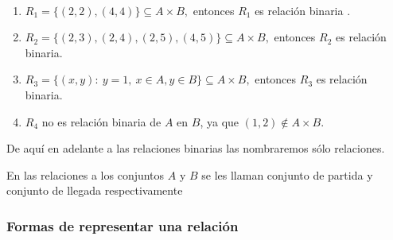 \solu\
\begin{enumerate}
\item $R_{1}=\{\left(2,2\right),\left(4,4\right)\}\subseteq A\times B,$
entonces $R_{1}$ es relación binaria .
\item $R_{2}=\{\left(2,3\right),\left(2,4\right),\left(2,5\right),\left(4,5\right)\}\subseteq A\times B,$
entonces $R_{2}$ es relación binaria.
\item $R_{3}=\{\left(x,y\right):\:y=1,\:x\in A,y\in B\}\subseteq A\times B,$
entonces $R_{3}$ es relación binaria.
\item $R_{4}$ no es relación binaria de $A$ en $B$, ya que $\left(1,2\right)\notin A\times B.$
\end{enumerate}
\obs De aquí en adelante a las relaciones binarias las nombraremos
sólo relaciones.

\noindent\obs En las relaciones a los conjuntos $A$ y $B$ se les
llaman conjunto de partida y conjunto de llegada respectivamente

\subsubsection{Formas de representar una relación}

